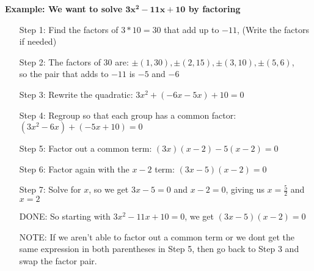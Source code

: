 \documentclass[12pt]{article}
\begin{document}
\noindent
    \textbf{Example: We want to solve $\mathbf{3x^2-11x+10}$ by factoring}
\begin{enumerate}[
    leftmargin=1.75cm,
    labelsep=0pt,
    font=\bfseries
    ]
    \renewcommand{\labelenumi}{}
    \item[Step 1: ] Find the factors of $3*10=30$ that add up to $-11$, (Write the factors if needed)
    \item[Step 2: ] The factors of $30$ are: $\pm(1,30), \pm(2,15),\pm(3,10),\pm(5,6)$, \\
                    so the pair that adds to $-11$ is $-5$ and $-6$
    \item[Step 3: ] Rewrite the quadratic:                          \hspace*{160pt}  $3x^2+(-6x-5x)+10=0$
    \item[Step 4: ] Regroup so that each group has a common factor: \hspace*{5pt} $(3x^2-6x)+(-5x+10)=0$
    \item[Step 5: ] Factor out a common term:                       \hspace*{130pt}  $(3x)(x-2)-5(x-2)=0$
    \item[Step 6: ] Factor again with the $x-2$ term:               \hspace*{135pt}       $(3x-5)(x-2)=0$
    \item[Step 7: ] Solve for $x$, so we get $ 3x - 5 = 0$ and $x - 2 = 0$, giving us $x=\frac{5}{2}$ and $x=2$
    \item[DONE: ] So starting with $3x^2-11x+10=0$, we get $(3x-5)(x-2)=0$
    \item[NOTE: ] If we aren't able to factor out a common term or we dont get the same 
                    expression in both parentheses in Step 5, then go back to Step 3 and swap the factor pair.

\end{enumerate}
\end{document}
